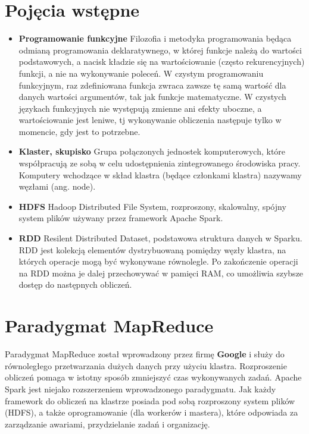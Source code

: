 \documentclass[magisterska]{pracamgr}
\theoremstyle{plain}
\theoremstyle{definition}
\theoremstyle{remark}
\begin{document}
\section{Pojęcia wstępne}
\begin{itemize}
 \item \textbf{Programowanie funkcyjne}
Filozofia i metodyka programowania będąca odmianą programowania deklaratywnego, 
w której funkcje należą do wartości podstawowych, a nacisk kładzie się na wartościowanie 
(często rekurencyjnych) funkcji, a nie na wykonywanie poleceń.
W czystym programowaniu funkcyjnym, raz zdefiniowana funkcja zwraca zawsze 
tę samą wartość dla danych wartości argumentów, tak jak funkcje matematyczne.
W czystych językach funkcyjnych nie występują zmienne ani efekty uboczne, 
a wartościowanie jest leniwe, tj wykonywanie obliczenia następuje tylko w momencie, gdy jest to potrzebne.

\item \textbf{Klaster, skupisko}
Grupa połączonych jednostek komputerowych, które współpracują ze sobą w celu udostępnienia zintegrowanego środowiska pracy.
Komputery wchodzące w skład klastra (będące członkami klastra) nazywamy węzłami (ang. node).

\item \textbf{HDFS}
Hadoop Distributed File System, rozproszony, skalowalny, spójny system plików używany przez framework Apache Spark.

\item \textbf{RDD}
Resilent Distributed Dataset, podstawowa struktura danych w Sparku. RDD jest kolekcją elementów dystrybuowaną pomiędzy 
węzły klastra, na których operacje mogą być wykonywane równolegle. Po zakończenie operacji na RDD można je dalej 
przechowywać w pamięci RAM, co umożliwia szybsze dostęp do następnych obliczeń. 
\end{itemize}




\section{Paradygmat MapReduce}

Paradygmat MapReduce został wprowadzony przez firmę \textbf{Google} i służy do równoległego przetwarzania
dużych danych przy użyciu klastra.
Rozproszenie obliczeń pomaga w istotny sposób zmniejszyć czas wykonywanych zadań.
Apache Spark jest niejako rozszerzeniem wprowadzonego paradygmatu. 
Jak każdy framework do obliczeń na klastrze posiada pod sobą rozproszony system plików (HDFS), 
a także oprogramowanie (dla workerów i mastera), które odpowiada za zarządzanie awariami, przydzielanie 
zadań i organizację. 
\newpage
\end{document}
